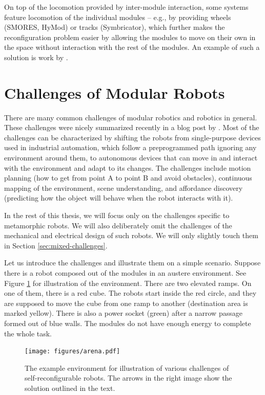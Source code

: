 On top of the locomotion provided by inter-module interaction, some systems
feature locomotion of the individual modules -- e.g., by providing wheels
(SMORES, HyMod) or tracks (Symbricator), which further makes the reconfiguration
problem easier by allowing the modules to move on their own in the space without
interaction with the rest of the modules. An example of such a solution is
work by \textcite{DBLP:journals/ral/LiuWY19}.

\section{Challenges of Modular Robots}

There are many common challenges of modular robotics and robotics in general.
These challenges were nicely summarized recently in a blog post by
\textcite{locklin_2020}. Most of the challenges can be characterized by shifting
the robots from single-purpose devices used in industrial automation, which
follow a preprogrammed path ignoring any environment around them, to autonomous
devices that can move in and interact with the environment and adapt to its
changes. The challenges include motion planning (how to get from
point A to point B and avoid obstacles), continuous mapping of the environment,
scene understanding, and affordance discovery (predicting how the object will
behave when the robot interacts with it).

In the rest of this thesis, we will focus only on the challenges specific to
metamorphic robots. We will also deliberately omit the challenges of the
mechanical and electrical design of such robots. We will only slightly touch
them in Section \ref{sec:mixed-challenges}.

Let us introduce the challenges and illustrate them on a simple scenario.
Suppose there is a robot composed out of the modules in an austere environment.
See Figure \ref{fig:arena} for illustration of the environment. There are two
elevated ramps. On one of them, there is a red cube. The robots start inside the
red circle, and they are supposed to move the cube from one ramp to another
(destination area is marked yellow). There is also a power socket (green) after
a narrow passage formed out of blue walls. The modules do not have enough energy
to complete the whole task.

\begin{figure}[!t]
    \centering
    \texttt{[image: figures/arena.pdf]}
    \caption{The example environment for illustration of various challenges of
    self-reconfigurable robots. The arrows in the right image show the
    solution outlined in the text.}
    \label{fig:arena}
\end{figure}

